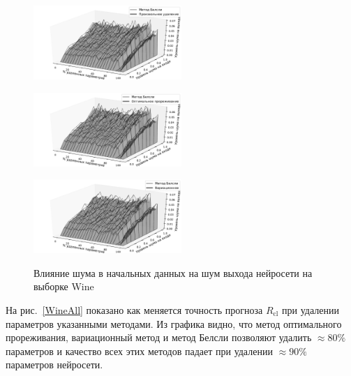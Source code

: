 \begin{figure}[h!t]\center
\begin{minipage}[t]{.5\textwidth}
{\includegraphics[width=0.5\textwidth]{plots/grabovoy/Wine/RandomNoise3D.pdf}}
\end{minipage}

\begin{minipage}[t]{.5\textwidth}
{\includegraphics[width=0.5\textwidth]{plots/grabovoy/Wine/OBDNoise3D.pdf}}
\end{minipage}

\begin{minipage}[t]{.5\textwidth}
{\includegraphics[width=0.5\textwidth]{plots/grabovoy/Wine/VariationalNoise3D.pdf}}
\end{minipage}

\label{WineNoise}
\caption{Влияние шума в начальных данных на шум выхода нейросети на выборке Wine}
\end{figure}

На рис.~\ref{WineAll} показано как меняется точность прогноза $R_{\text{cl}}$ при удалении параметров указанными методами. Из графика видно, что метод оптимального прореживания, вариационный метод и метод Белсли позволяют удалить $\approx80\%$ параметров и качество всех этих методов падает при удалении $\approx90\%$ параметров нейросети. 

